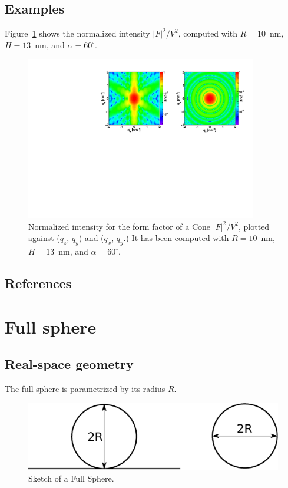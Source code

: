 \subsection{Examples}
Figure~\ref{figFFConeEx} shows the normalized intensity
$|F|^2/V^2$, computed with $R=10$~nm, $H=13$~nm, and $\alpha=60^{\circ}$.
\begin{figure}[h]
\begin{center}
\includegraphics[width=0.9\textwidth]{Figures/figffcone}
\end{center}
\caption{Normalized intensity for the form factor of a Cone
  $|F|^2/V^2$, plotted against ($q_z$, $q_y$) and ($q_x$, $q_y$.) It
  has been  computed with $R=10$~nm, $H=13$~nm,
  and $\alpha=60^{\circ}$.}
\label{figFFConeEx}
\end{figure}


\subsection{References}


\newpage{\cleardoublepage}
\section{Full sphere} 

\subsection{Real-space geometry}
The full sphere is parametrized by its radius $R$. 
\begin{figure}[ht]
\begin{center}
\includegraphics[width=0.6\columnwidth]{Figures/fullsphere}
\caption{Sketch of a Full Sphere.}
\end{center}
\label{fullsphere}
\end{figure}

